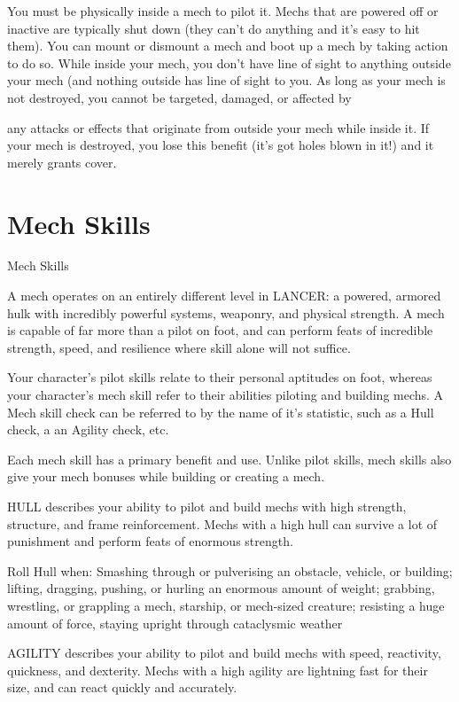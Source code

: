 You must be physically inside a mech to pilot it. Mechs that are powered off or inactive are
typically shut down (they can’t do anything and it’s easy to hit them). You can mount or
dismount a mech and boot up a mech by taking action to do so. While inside your mech, you
don’t have line of sight to anything outside your mech (and nothing outside has line of sight to
you. As long as your mech is not destroyed, you cannot be targeted, damaged, or affected by




any attacks or effects that originate from outside your mech while inside it. If your mech is
destroyed, you lose this benefit (it’s got holes blown in it!) and it merely grants cover.


\chapter{Mech Skills}
                                                  Mech Skills

A mech operates on an entirely different level in LANCER: a powered, armored hulk with
incredibly powerful systems, weaponry, and physical strength. A mech is capable of far more than
a pilot on foot, and can perform feats of incredible strength, speed, and resilience where skill
alone will not suffice.

Your character’s pilot skills relate to their personal aptitudes on foot, whereas your character’s
mech skill refer to their abilities piloting and building mechs. A Mech skill check can be referred to
by the name of it’s statistic, such as a Hull check, a an Agility check, etc.

Each mech skill has a primary benefit and use. Unlike pilot skills, mech skills also give your mech
bonuses while building or creating a mech.

HULL describes your ability to pilot and build mechs with high strength, structure, and frame
reinforcement. Mechs with a high hull can survive a lot of punishment and perform feats of
enormous strength.

Roll Hull when: Smashing through or pulverising an obstacle, vehicle, or building; lifting, dragging,
pushing, or hurling an enormous amount of weight; grabbing, wrestling, or grappling a mech,
starship, or mech-sized creature; resisting a huge amount of force, staying upright through
cataclysmic weather

AGILITY describes your ability to pilot and build mechs with speed, reactivity, quickness, and
dexterity. Mechs with a high agility are lightning fast for their size, and can react quickly and
accurately.

